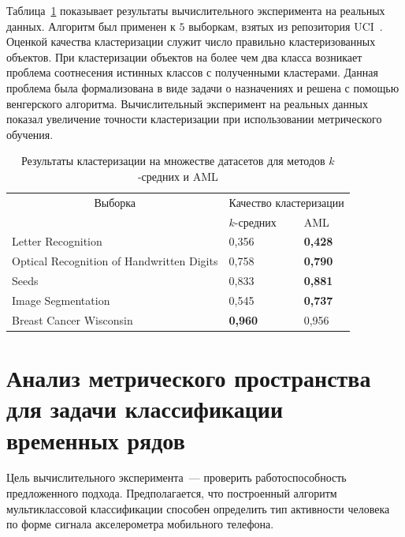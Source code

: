 Таблица~\ref{ch4:tbl:clusteing_results} показывает результаты вычислительного эксперимента на реальных
данных.
Алгоритм был применен к $5$ выборкам, взятых из репозитория UCI~\cite{uci2017}.
Оценкой качества кластеризации служит число правильно кластеризованных объектов.
При клас\-те\-ри\-за\-ции объектов на более чем два класса возникает проблема соотнесения истинных классов с полученными кластерами.
Данная проблема была формализована в виде задачи о назначениях и решена с помощью венгерского алгоритма. Вычислительный эксперимент на реальных данных показал увеличение точности кластеризации при использовании метрического обучения.
\begin{table} %
\centering
\caption{Результаты кластеризации на множестве датасетов для методов $k$-средних и AML}
\label{ch4:tbl:clusteing_results}

\vspace{2ex}

\begin{tabular}{|l|l|l|}
\hline
\multicolumn{1}{|c}{Выборка}                  & \multicolumn{2}{c|}{Качество кластеризации} \\ \cline{2-3}
                                          & $k$-средних               & AML                 \\
\hline
Letter Recognition                        & 0,356                 & \textbf{0,428}             \\
Optical Recognition of Handwritten Digits & 0,758                 & \textbf{0,790}               \\
Seeds                                     & 0,833                 & \textbf{0,881}            \\
Image Segmentation                        & 0,545                 & \textbf{0,737}            \\
Breast Cancer Wisconsin                   & \textbf{0,960}                 & 0,956               \\ \hline
\end{tabular}
\end{table}



	\section{Анализ метрического пространства для задачи классификации временных рядов}
	Цель вычислительного эксперимента~--- проверить работоспособность предложенного подхода.
	Предполагается, что построенный алгоритм мультиклассовой классификации способен определить тип активности человека по форме сигнала акселерометра мобильного телефона.
	
